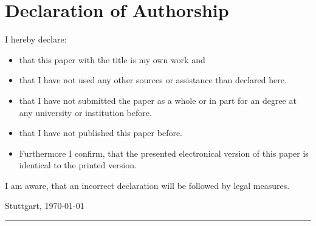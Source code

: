 \clearpage
\chapter*{Declaration of Authorship}
\thispagestyle{scrheadings}



I hereby declare:

\begin{itemize}
	\item that this paper with the title \textit{\dertitel} is my own work and
	\item that I have not used any other sources or assistance than declared here.
	\item that I have not submitted the paper as a whole or in part for an degree at any university
		or institution before.
	\item that I have not published this paper before.
	\item Furthermore I confirm, that the presented electronical version of this paper
		is identical to the printed version.
\end{itemize}
I am aware, that an incorrect declaration will be followed by legal measures.

\vspace{3cm}
Stuttgart, \today
\vspace{3em}

\rule{6cm}{0.4pt}\\
\derautor
